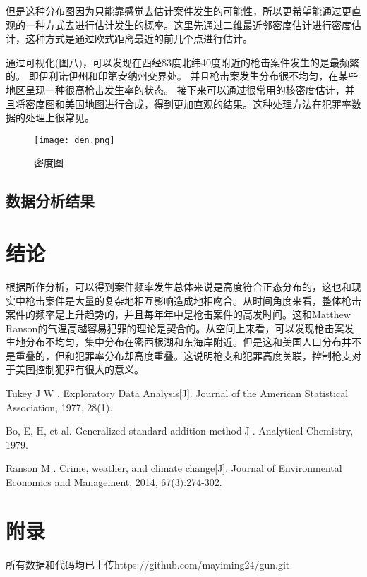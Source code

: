 \documentclass[12pt]{ctexart}
\renewcommand{\baselinestretch}{1.2}
\begin{document}
但是这种分布图因为只能靠感觉去估计案件发生的可能性，所以更希望能通过更直观的一种方式去进行估计发生的概率。这里先通过二维最近邻密度估计进行密度估计，这种方式是通过欧式距离最近的前几个点进行估计。



通过可视化(图八)，可以发现在西经83度北纬40度附近的枪击案件发生的是最频繁的。 即伊利诺伊州和印第安纳州交界处。
并且枪击案发生分布很不均匀，在某些地区呈现一种很高枪击发生率的状态。 接下来可以通过很常用的核密度估计，并且将密度图和美国地图进行合成，得到更加直观的结果。这种处理方法在犯罪率数据的处理上很常见。

\begin{figure}[!htb]
	\centering
	\texttt{[image: den.png]} %
	\caption{密度图} %
\end{figure}



\subsection{数据分析结果}


\section{结论}
根据所作分析，可以得到案件频率发生总体来说是高度符合正态分布的，这也和现实中枪击案件是大量的复杂地相互影响造成地相吻合。从时间角度来看，整体枪击案件的频率是上升趋势的，并且每年年中是枪击案件的高发时间。这和Matthew Ranson的气温高越容易犯罪的理论是契合的\cite{Ranson M}。从空间上来看，可以发现枪击案发生地分布不均匀，集中分布在密西根湖和东海岸附近。但是这和美国人口分布并不是重叠的，但和犯罪率分布却高度重叠。这说明枪支和犯罪高度关联，控制枪支对于美国控制犯罪有很大的意义。





\normalsize
\begin{thebibliography}{}


Tukey J W . Exploratory Data Analysis[J]. Journal of the American Statistical Association, 1977, 28(1).

Bo, E, H, et al. Generalized standard addition method[J]. Analytical Chemistry, 1979.

Ranson M . Crime, weather, and climate change[J]. Journal of Environmental Economics and Management, 2014, 67(3):274-302.


\end{thebibliography}


\section*{附录}
所有数据和代码均已上传https://github.com/mayiming24/gun.git
\end{document}
